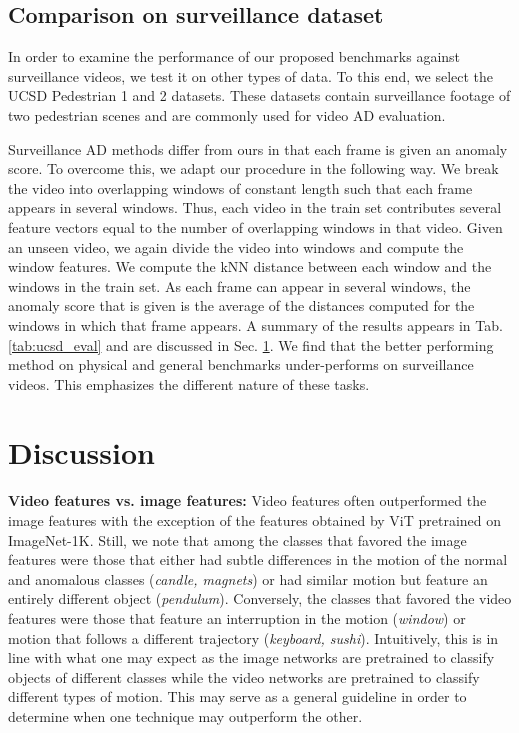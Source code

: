 \documentclass{article}
\begin{document}
\subsection{Comparison on surveillance dataset}

In order to examine the performance of our proposed benchmarks against surveillance videos, we test it on other types of data. To this end, we select the UCSD Pedestrian 1 and 2 datasets. These datasets contain surveillance footage of two pedestrian scenes and are commonly used for video AD evaluation.

Surveillance AD methods differ from ours in that each frame is given an anomaly score. To overcome this, we adapt our procedure in the following way. We break the video into overlapping windows of constant length such that each frame appears in several windows. Thus, each video in the train set contributes several feature vectors equal to the number of overlapping windows in that video. Given an unseen video, we again divide the video into windows and compute the window features. We compute the kNN distance between each window and the windows in the train set. As each frame can appear in several windows, the anomaly score that is given is the average of the distances computed for the windows in which that frame appears. A summary of the results appears in Tab.\ref{tab:ucsd_eval} and are discussed in Sec. \ref{sec:discussion}. We find that the better performing method on physical and general benchmarks under-performs on surveillance videos. This emphasizes the different nature of these tasks.













\section{Discussion}
\label{sec:discussion}

\textbf{Video features vs. image features:} Video features often outperformed the image features with the exception of the features obtained by ViT pretrained on ImageNet-1K. Still, we note that among the classes that favored the image features were those that either had subtle differences in the motion of the normal and anomalous classes (\textit{candle, magnets}) or had similar motion but feature an entirely different object (\textit{pendulum}).  Conversely, the classes that favored the video features were those that feature an interruption in the motion (\textit{window}) or motion that follows a different trajectory (\textit{keyboard, sushi}). Intuitively, this is in line with what one may expect as the image networks are pretrained to classify objects of different classes while the video networks are pretrained to classify different types of motion. This may serve as a general guideline in order to determine when one technique may outperform the other. 
\end{document}
